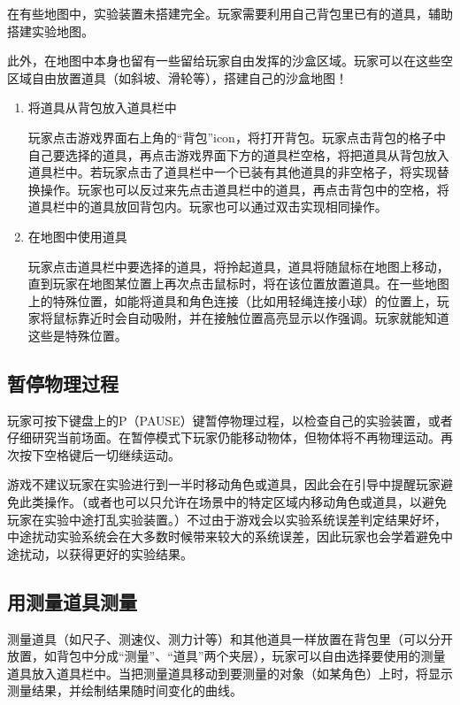 \documentclass{tstextbook}
\begin{document}
在有些地图中，实验装置未搭建完全。玩家需要利用自己背包里已有的道具，辅助搭建实验地图。

此外，在地图中本身也留有一些留给玩家自由发挥的沙盒区域。玩家可以在这些空区域自由放置道具（如斜坡、滑轮等），搭建自己的沙盒地图！

\begin{enumerate}

\item{将道具从背包放入道具栏中}

玩家点击游戏界面右上角的“背包”icon，将打开背包。玩家点击背包的格子中自己要选择的道具，再点击游戏界面下方的道具栏空格，将把道具从背包放入道具栏中。若玩家点击了道具栏中一个已装有其他道具的非空格子，将实现替换操作。玩家也可以反过来先点击道具栏中的道具，再点击背包中的空格，将道具栏中的道具放回背包内。玩家也可以通过双击实现相同操作。

\item{在地图中使用道具}

玩家点击道具栏中要选择的道具，将拎起道具，道具将随鼠标在地图上移动，直到玩家在地图某位置上再次点击鼠标时，将在该位置放置道具。在一些地图上的特殊位置，如能将道具和角色连接（比如用轻绳连接小球）的位置上，玩家将鼠标靠近时会自动吸附，并在接触位置高亮显示以作强调。玩家就能知道这些是特殊位置。

\end{enumerate}

\subsection{暂停物理过程}

玩家可按下键盘上的P（PAUSE）键暂停物理过程，以检查自己的实验装置，或者仔细研究当前场面。在暂停模式下玩家仍能移动物体，但物体将不再物理运动。再次按下空格键后一切继续运动。

游戏不建议玩家在实验进行到一半时移动角色或道具，因此会在引导中提醒玩家避免此类操作。（或者也可以只允许在场景中的特定区域内移动角色或道具，以避免玩家在实验中途打乱实验装置。）不过由于游戏会以实验系统误差判定结果好坏，中途扰动实验系统会在大多数时候带来较大的系统误差，因此玩家也会学着避免中途扰动，以获得更好的实验结果。

\subsection{用测量道具测量}

测量道具（如尺子、测速仪、测力计等）和其他道具一样放置在背包里（可以分开放置，如背包中分成“测量”、“道具”两个夹层），玩家可以自由选择要使用的测量道具放入道具栏中。当把测量道具移动到要测量的对象（如某角色）上时，将显示测量结果，并绘制结果随时间变化的曲线。
\end{document}
